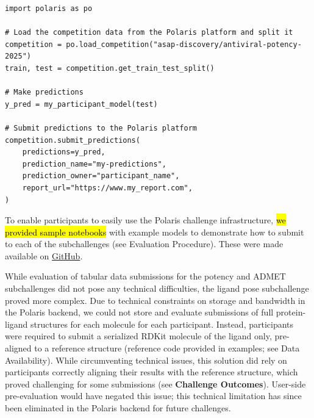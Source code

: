 \documentclass[journal=jcim,manuscript=article]{achemso}
\newenvironment{code}{\captionsetup{type=listing}}{}
\begin{document}
\begin{code}
\label{code:submission}
\begin{verbatim}
import polaris as po

# Load the competition data from the Polaris platform and split it
competition = po.load_competition("asap-discovery/antiviral-potency-2025")
train, test = competition.get_train_test_split()

# Make predictions
y_pred = my_participant_model(test)

# Submit predictions to the Polaris platform
competition.submit_predictions(
    predictions=y_pred,
    prediction_name="my-predictions",
    prediction_owner="participant_name",
    report_url="https://www.my_report.com",
)
\end{verbatim}
\end{code}


To enable participants to easily use the Polaris challenge infrastructure, \hl{we provided sample notebooks} with example models to demonstrate how to submit to each of the subchallenges (see Evaluation Procedure). These were made available on \href{https://github.com/asapdiscovery/asap-polaris-blind-challenge-examples}{GitHub}. 

While evaluation of tabular data submissions for the potency and ADMET subchallenges did not pose any technical difficulties, the ligand pose subchallenge proved more complex. Due to technical constraints on storage and bandwidth in the Polaris backend, we could not store and evaluate submissions of full protein-ligand structures for each molecule for each participant. Instead, participants were required to submit a serialized RDKit molecule of the ligand only, pre-aligned to a reference structure (reference code provided in examples; see Data Availability). While circumventing technical issues, this solution did rely on participants correctly aligning their results with the reference structure, which proved challenging for some submissions (see \textbf{Challenge Outcomes}). User-side pre-evaluation would have negated this issue; this technical limitation has since been eliminated in the Polaris backend for future challenges.
\end{document}
